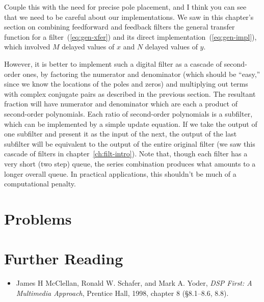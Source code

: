 Couple this with the need for precise pole placement, and I think you
can see that we need to be careful about our implementations. We saw
in this chapter's section on combining feedforward and feedback
filters the general transfer function for a filter~(\ref{eq:gen-xfer})
and its direct implementation~(\ref{eq:gen-impl}), which involved
$M$ delayed values of $x$ and $N$ delayed values of $y$.

However, it is better to implement such a digital filter as a cascade
of second-order ones, by factoring the numerator and denominator
(which should be ``easy,'' since we know the locations of the poles
and zeros) and multiplying out terms with complex conjugate pairs as
described in the previous section. The resultant fraction will have
numerator and denominator which are each a product of second-order
polynomials.  Each ratio of second-order polynomials is a subfilter,
which can be implemented by a simple update equation. If we take the
output of one subfilter and present it as the input of the next, the
output of the last subfilter will be equivalent to the output of the
entire original filter (we saw this cascade of filters in
chapter~\ref{ch:filt-intro}). Note that, though each filter has a very
short (two step) queue, the series combination produces what amounts
to a longer overall queue. In practical applications, this shouldn't
be much of a computational penalty.

\section{Problems}


\section{Further Reading}

\begin{itemize}
\item James H McClellan, Ronald W. Schafer, and Mark A. Yoder,
  \textit{DSP First: A Multimedia Approach}, Prentice Hall, 1998,
  chapter 8 (\S 8.1--8.6, 8.8).
\end{itemize}


